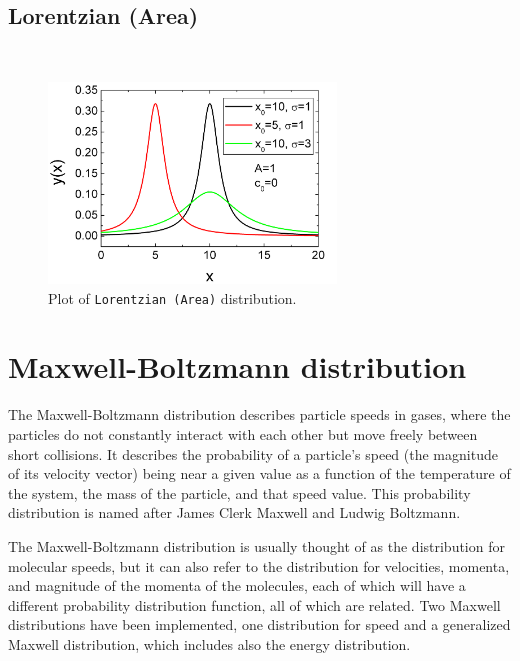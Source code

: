 \subsection{Lorentzian (Area)} ~\\
\label{sec:LorentzianArea}

\begin{figure}[htb]
\begin{center}
\includegraphics[width=0.6824\textwidth]{LorentzianArea.png}
\end{center}
\caption{Plot of \texttt{Lorentzian (Area)} distribution.}
\label{fig:LorentzianArea}
\end{figure}





\clearpage
\section{Maxwell-Boltzmann distribution}
\label{sec:MaxwellBoltzmann}

The Maxwell-Boltzmann distribution describes particle speeds in
gases, where the particles do not constantly interact with each
other but move freely between short collisions. It describes the
probability of a particle's speed (the magnitude of its velocity
vector) being near a given value as a function of the temperature
of the system, the mass of the particle, and that speed value.
This probability distribution is named after James Clerk Maxwell
and Ludwig Boltzmann.

The Maxwell-Boltzmann distribution is usually thought of as the
distribution for molecular speeds, but it can also refer to the
distribution for velocities, momenta, and magnitude of the momenta
of the molecules, each of which will have a different probability
distribution function, all of which are related. Two Maxwell
distributions have been implemented, one distribution for speed
and a generalized Maxwell distribution, which includes also the
energy distribution.

